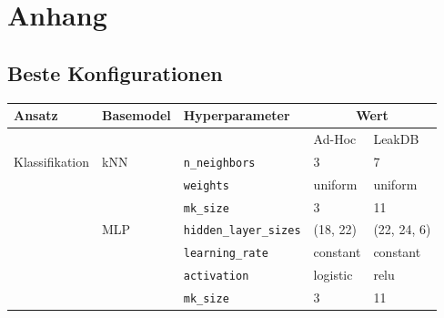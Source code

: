 \chapter{Anhang}

\section{Beste Konfigurationen \label{appendix-best-conf}}

\begin{table}[h]
    \footnotesize
    \begin{tabular}{lllll}
    Ansatz              & Basemodel & Hyperparameter                & \multicolumn{2}{c}{Wert} \\ \hline
                        &           &                               & Ad-Hoc      & LeakDB      \\ \cline{4-5} 
    Klassifikation      & kNN       & \texttt{n\_neighbors}         & 3           & 7           \\
                        &           & \texttt{weights}              & uniform     & uniform     \\
                        &           & \texttt{mk\_size}             & 3           & 11          \\
                        & MLP       & \texttt{hidden\_layer\_sizes} & (18, 22)    & (22, 24, 6) \\
                        &           & \texttt{learning\_rate}       & constant    & constant    \\
                        &           & \texttt{activation}           & logistic    & relu        \\
                        &           & \texttt{mk\_size}             & 3           & 11          \\
    \end{tabular}
\end{table}
